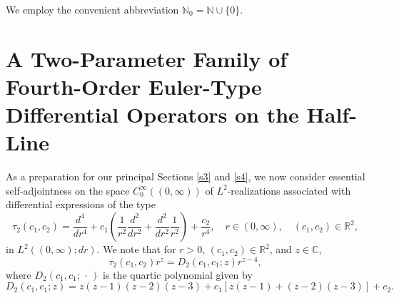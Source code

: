 \documentclass[reqno,11pt,centertags]{amsart}
\newcommand{\bbN}{{\mathbb{N}}}
\newcommand{\bbR}{{\mathbb{R}}}
\newcommand{\bbC}{{\mathbb{C}}}
\newcommand{\<}{\langle}
\renewcommand{\>}{\rangle}
\newcommand{\lb}{\label}
\newcommand{\dott}{\,\cdot\,}
\numberwithin{equation}{section}
\theoremstyle{definition}
\begin{document}
We employ the convenient abbreviation $\bbN_0 = \bbN \cup \{0\}$.


\section{A Two-Parameter Family of Fourth-Order Euler-Type Differential Operators on the Half-Line} \lb{s2}

As a preparation for our principal Sections \ref{s3} and \ref{s4}, we now consider essential self-adjointness on the space $C_0^{\infty}((0,\infty))$ of $L^2$-realizations associated with differential expressions  of the type
\begin{equation}
\tau_2(c_1,c_2)= \frac{d^4}{dr^4} + c_1\left(\frac{1}{r^2}\frac{d^2}{dr^2} +\frac{d^2}{dr^2}\frac{1}{r^2}\right) +  \frac{c_2}{r^4} , \quad r \in (0,\infty), \quad (c_1, c_2)\in \bbR^2,
\end{equation}
in $L^2((0,\infty);dr)$. We note that for $r>0$, $(c_1, c_2)\in \bbR^2$, and $z \in \bbC$,   
\begin{equation}
\tau_2(c_1,c_2)r^z = D_2(c_1,c_1;z)r^{z-4},
\end{equation}
where $D_2(c_1,c_1;\dott)$ is the quartic polynomial given by
\begin{equation}
D_2(c_1,c_1; z)=z(z-1)(z-2)(z-3) +c_1\left[z(z-1)+(z-2)(z-3)\right] +c_2. 
\end{equation}
\end{document}
